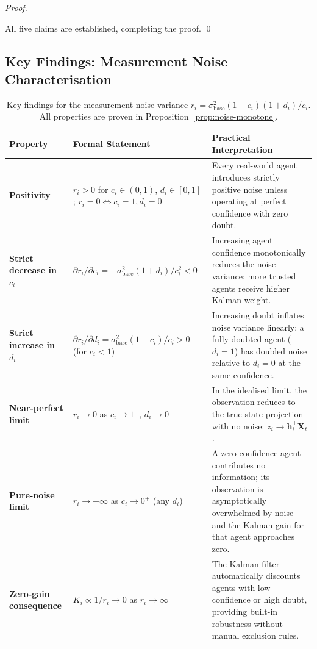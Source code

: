 \documentclass[12pt,openany]{book}
\numberwithin{equation}{chapter}
\theoremstyle{plain}
\theoremstyle{definition}
\theoremstyle{remark}
\renewcommand{\arraystretch}{1.2}
\begin{document}
\begin{proof}
\begin{enumerate}
\end{enumerate}

All five claims are established, completing the proof.
\qed
\end{proof}

\subsection*{Key Findings: Measurement Noise Characterisation}

\begin{table}[H]
\begin{center}
\small
\renewcommand{\arraystretch}{1.45}
\begin{tabularx}{\linewidth}{>{\bfseries}p{3.8cm} X X}
\toprule
\textbf{Property} & \textbf{Formal Statement} &
\textbf{Practical Interpretation} \\
\midrule
Positivity &
$r_i > 0$ for $c_i \in (0,1)$, $d_i \in [0,1]$;
$r_i = 0 \Leftrightarrow c_i=1, d_i=0$ &
Every real-world agent introduces strictly positive noise
unless operating at perfect confidence with zero doubt. \\

Strict decrease in $c_i$ &
$\partial r_i / \partial c_i = -\sigma_{\mathrm{base}}^2
(1+d_i)/c_i^2 < 0$ &
Increasing agent confidence monotonically reduces the noise
variance; more trusted agents receive higher Kalman weight. \\

Strict increase in $d_i$ &
$\partial r_i / \partial d_i = \sigma_{\mathrm{base}}^2
(1-c_i)/c_i > 0$ (for $c_i < 1$) &
Increasing doubt inflates noise variance linearly; a fully
doubted agent ($d_i=1$) has doubled noise relative to $d_i=0$
at the same confidence. \\

Near-perfect limit &
$r_i \to 0$ as $c_i \to 1^{-}$, $d_i \to 0^{+}$ &
In the idealised limit, the observation reduces to the true
state projection with no noise: $z_i \to \mathbf{h}_i^\top
\mathbf{X}_t$. \\

Pure-noise limit &
$r_i \to +\infty$ as $c_i \to 0^{+}$ (any $d_i$) &
A zero-confidence agent contributes no information; its
observation is asymptotically overwhelmed by noise and the
Kalman gain for that agent approaches zero. \\

Zero-gain consequence &
$K_i \propto 1/r_i \to 0$ as $r_i \to \infty$ &
The Kalman filter automatically discounts agents with low
confidence or high doubt, providing built-in robustness
without manual exclusion rules. \\
\bottomrule
\end{tabularx}
\caption{Key findings for the measurement noise variance
$r_i = \sigma_{\mathrm{base}}^2 (1-c_i)(1+d_i)/c_i$.
All properties are proven in
Proposition~\ref{prop:noise-monotone}.}
\label{tab:noise-key-findings}
\end{center}
\end{table}
\end{document}
